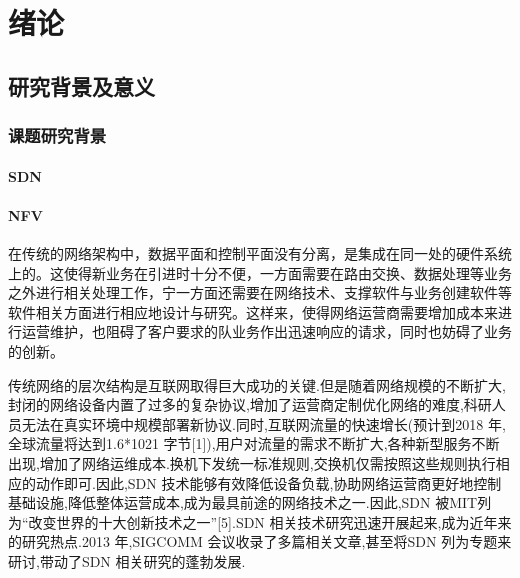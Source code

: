 \chapter{绪论}
\section{研究背景及意义}
\subsection{课题研究背景}
\subsubsection{SDN}
\subsubsection{NFV}


在传统的网络架构中，数据平面和控制平面没有分离，是集成在同一处的硬件系统上的。这使得新业务在引进时十分不便，一方面需要在路由交换、数据处理等业务之外进行相关处理工作，宁一方面还需要在网络技术、支撑软件与业务创建软件等软件相关方面进行相应地设计与研究。这样来，使得网络运营商需要增加成本来进行运营维护，也阻碍了客户要求的队业务作出迅速响应的请求，同时也妨碍了业务的创新。

传统网络的层次结构是互联网取得巨大成功的关键.但是随着网络规模的不断扩大,封闭的网络设备内置了过多的复杂协议,增加了运营商定制优化网络的难度,科研人员无法在真实环境中规模部署新协议.同时,互联网流量的快速增长(预计到2018 年,全球流量将达到1.6*1021 字节[1]),用户对流量的需求不断扩大,各种新型服务不断出现,增加了网络运维成本.换机下发统一标准规则,交换机仅需按照这些规则执行相应的动作即可.因此,SDN 技术能够有效降低设备负载,协助网络运营商更好地控制基础设施,降低整体运营成本,成为最具前途的网络技术之一.因此,SDN 被MIT列为“改变世界的十大创新技术之一”[5].SDN 相关技术研究迅速开展起来,成为近年来的研究热点.2013 年,SIGCOMM 会议收录了多篇相关文章,甚至将SDN 列为专题来研讨,带动了SDN 相关研究的蓬勃发展.

